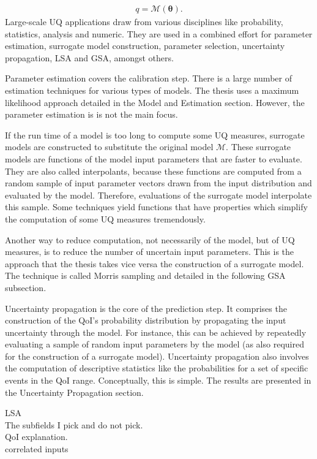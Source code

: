 \begin{align}
q = \mathcal{M}(\pmb{\theta}).
\end{align}
Large-scale UQ applications draw from various disciplines like probability, statistics, analysis and numeric. They are used in a combined effort for parameter estimation, surrogate model construction, parameter selection, uncertainty propagation, LSA and GSA, amongst others. 

Parameter estimation covers the calibration step. There is a large number of estimation techniques for various types of models. The thesis uses a maximum likelihood approach detailed in the Model and Estimation section. However, the parameter estimation is is not the main focus.


If the run time of a model is too long to compute some UQ measures, surrogate models are constructed to substitute the original model $\mathcal{M}$. These surrogate models are functions of the model input parameters that are faster to evaluate. They are also called interpolants, because these functions are computed from a random sample of input parameter vectors drawn from the input distribution and evaluated by the model. Therefore, evaluations of the surrogate model interpolate this sample. Some techniques yield functions that have properties which simplify the computation of some UQ measures tremendously.

Another way to reduce computation, not necessarily of the model, but of UQ measures, is to reduce the number of uncertain input parameters. This is the approach that the thesis takes vice versa the construction of a surrogate model. The technique is called Morris sampling and detailed in the following GSA subsection.

Uncertainty propagation is the core of the prediction step. It comprises the construction of the QoI's probability distribution by propagating the input uncertainty through the model. For instance, this can be achieved by repeatedly evaluating a sample of random input parameters by the model (as also required for the construction of a surrogate model). Uncertainty propagation also involves the computation of descriptive statistics like the probabilities for a set of specific events in the QoI range. Conceptually, this is simple. The results are presented in the Uncertainty Propagation section.

LSA
\\
\newline
The subfields I pick and do not pick.
\\
\newline
QoI explanation.\\
\newline
correlated inputs



